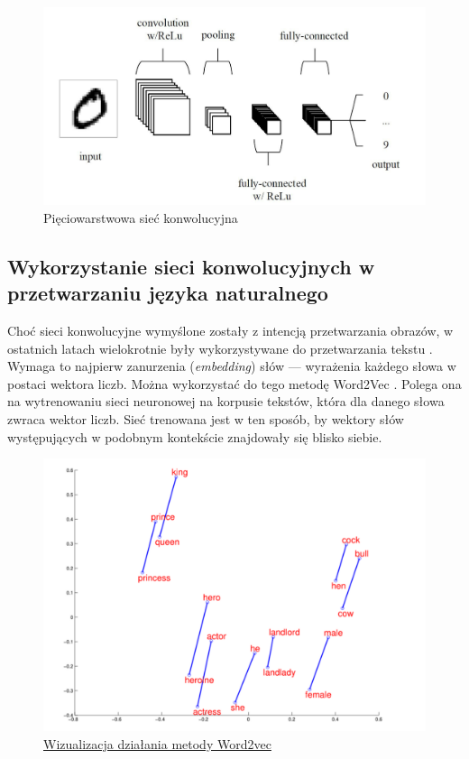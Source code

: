 \begin{figure}[H]
	\centering
	\includegraphics[width=0.8\linewidth]{images/chapter2/layered-conv.pdf}
	\caption{Pięciowarstwowa sieć konwolucyjna \cite{o2015introduction}}
	\label{fig:layered-conv}
\end{figure}

\subsection{Wykorzystanie sieci konwolucyjnych w przetwarzaniu języka naturalnego}
\label{subsec:word2vec}

Choć sieci konwolucyjne wymyślone zostały z intencją przetwarzania obrazów, w ostatnich latach wielokrotnie były wykorzystywane do przetwarzania tekstu \cite{minaee2019deep}. Wymaga to najpierw zanurzenia (\textit{embedding}) słów --- wyrażenia każdego słowa w postaci wektora liczb. Można wykorzystać do tego metodę Word2Vec \cite{mikolov2013efficient}. Polega ona na wytrenowaniu sieci neuronowej na korpusie tekstów, która dla danego słowa zwraca wektor liczb. Sieć trenowana jest w ten sposób, by wektory słów występujących w podobnym kontekście znajdowały się blisko siebie.

\begin{figure}[h]
	\centering
	\includegraphics[width=0.8\linewidth]{images/chapter2/w2vpng.pdf}
	\caption{\href{https://drive.google.com/file/d/0B7XkCwpI5KDYRWRnd1RzWXQ2TWc/edit?resourcekey=0-oGRnY6qG7yWEqCXOHFKPcw}
		{Wizualizacja działania metody Word2vec}}
	\label{fig:word2vec}
\end{figure}

